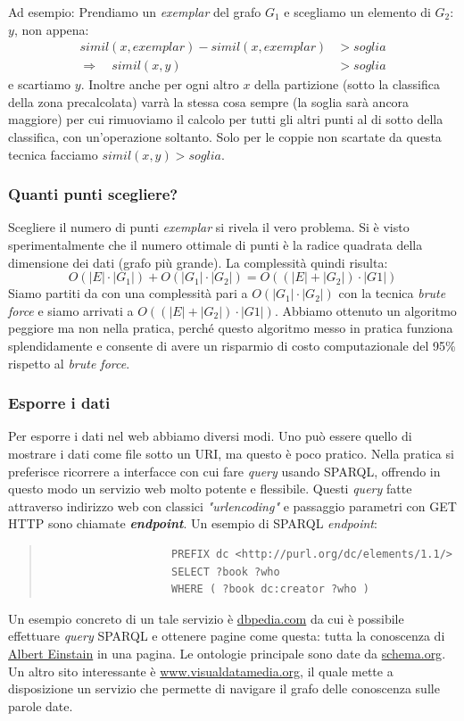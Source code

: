 			Ad esempio:
				Prendiamo un \emph{exemplar} del grafo $G_1$ e scegliamo un elemento di $G_2$: $y$, non appena:
				\begin{align}
					simil(x,exemplar)-simil(x,exemplar)&>soglia \\
					\Rightarrow \quad simil(x,y)&>soglia
				\end{align}
				e scartiamo $y$. Inoltre anche per ogni altro $x$ della partizione (sotto la classifica della zona precalcolata) varrà la stessa cosa sempre (la soglia sarà ancora maggiore) per cui rimuoviamo il calcolo per tutti gli altri punti al di sotto della classifica, con un'operazione soltanto.	
				Solo per le coppie non scartate da questa tecnica facciamo $simil(x,y)>soglia$.
		
			\subsubsection{Quanti punti scegliere?}
				Scegliere il numero di punti \emph{exemplar} si rivela il vero problema. Si è visto sperimentalmente che il numero ottimale di punti è la radice quadrata della  dimensione dei dati (grafo più grande). La complessità quindi risulta:
				\[
					O(|E| \cdot |G_1|) + O(|G_1| \cdot |G_2|) = O((|E| + |G_2|) \cdot |G1|)
				\]
				Siamo partiti da con una complessità pari a $O(|G_1|\cdot|G_2|)$ con la tecnica \emph{brute force} e siamo arrivati a $O((|E| + |G_2|) \cdot |G1|)$. Abbiamo ottenuto un algoritmo peggiore ma non nella pratica, perché questo algoritmo messo in pratica funziona splendidamente e consente di avere un risparmio di costo computazionale del 95\% rispetto al \emph{brute force}.
			
			\subsubsection{Esporre i dati}
				Per esporre i dati nel web abbiamo diversi modi. Uno può essere quello di mostrare i dati come file sotto un URI, ma questo è poco pratico. Nella pratica si preferisce ricorrere a interfacce con cui fare \emph{query} usando SPARQL, offrendo in questo modo un servizio web molto potente e flessibile. Questi \emph{query} fatte attraverso indirizzo web con classici \emph{"urlencoding"} e passaggio parametri con GET HTTP sono chiamate \textbf{\emph{endpoint}}. Un esempio di SPARQL \emph{endpoint}:
				\begin{quote}
				\begin{verbatim}
					PREFIX dc <http://purl.org/dc/elements/1.1/>
					SELECT ?book ?who
					WHERE ( ?book dc:creator ?who )
				\end{verbatim}
				\end{quote}
				Un esempio concreto di un tale servizio è \href{http://wiki.dbpedia.org/}{dbpedia.com} da cui è possibile effettuare \emph{query} SPARQL e ottenere pagine come questa: tutta la conoscenza di \href{http://dbpedia.org/page/Albert_Einstein}{Albert Einstain} in una pagina.
				Le ontologie principale sono date da \href{https://schema.org/}{schema.org}. Un altro sito interessante è \href{http://www.visualdataweb.org/relfinder.php}{www.visualdatamedia.org}, il quale mette a disposizione un servizio che permette di navigare il grafo delle conoscenza sulle parole date. 
					
					
					